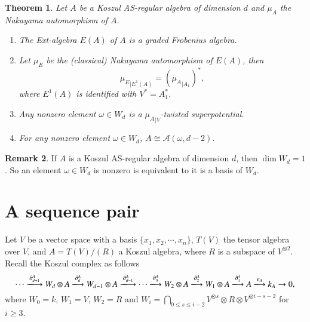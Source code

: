 \documentclass[a4paper,10pt]{amsart}
\newtheorem{theorem}{Theorem}[section]
\theoremstyle{definition}
\newtheorem{remark}[theorem]{Remark}
\numberwithin{equation}{section}
\begin{document}
\begin{theorem}\label{thm: properties of Koszul regular algebras}Let $A$ be a Koszul AS-regular algebra of dimension $d$ and $\mu_A$ the Nakayama automorphism of $A$.
\begin{enumerate}
\item \cite[Proposition 5.10]{Sm} The Ext-algebra $E(A)$ of $A$ is a graded Frobenius algebra.
\item\cite[Proposition 3]{V} Let $\mu_E$ be the (classical) Nakayama automorphism of $E(A)$, then
    $$
    {\mu_E}_{|E^1(A)}=({\mu_A}_{|A_1})^*,
    $$
    where $E^1(A)$ is identified with $V^*=A_1^*$.
\item \cite[Lemma 4.3]{HVZ}
Any nonzero element $\omega\in W_d$ is a ${\mu_A}_{\mid V}$-twisted superpotential.

\item \cite[Theorem 11]{DV}\cite[Theorem 4.4(i)]{HVZ} For any nonzero element $\omega\in W_d$, $A\cong \mathcal{A}(\omega,d-2)$.
\end{enumerate}
\end{theorem}
\begin{remark}
If $A$ is a Koszul AS-regular algebra of dimension $d$, then $\dim W_d=1$. So an element $\omega\in W_d$ is nonzero is equivalent to it is a basis of $W_d$.
\end{remark}
%
%
%




%






\section{A sequence pair}
Let $V$ be a vector space with a basis $\{x_1,x_2,\cdots,x_n\}$, $T(V)$ the tensor algebra over $V$, and $A=T(V)/(R)$ a Koszul algebra, where $R$ is a subspace of $V^{\otimes 2}$. Recall the Koszul complex as follows
\begin{equation}\label{resolution of k_A}
\cdots\xlongrightarrow{\partial_{d+1}^A} W_d\otimes A\xlongrightarrow{\partial^A_d}W_{d-1}\otimes A\xlongrightarrow{\partial^A_{d-1}}\cdots\xlongrightarrow{\partial^A_{3}}W_2\otimes A\xlongrightarrow{\partial^A_{2}}W_1\otimes A\xlongrightarrow{\partial^A_{1}}A\xlongrightarrow{\varepsilon_A}k_A\to0,
\end{equation}
where $W_0=k$, $W_1=V$, $W_2=R$ and $
W_{i}=\bigcap_{0\leq s\leq i-2} V^{\otimes s}\otimes R\otimes V^{\otimes i-s-2}
$ for $i\geq 3$.
\end{document}

